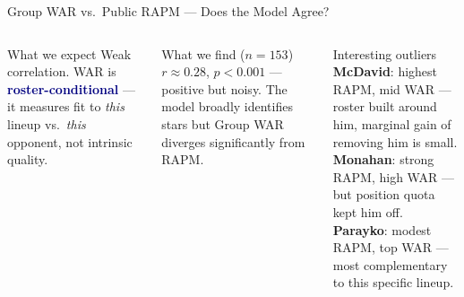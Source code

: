 \documentclass[aspectratio=169,11pt]{beamer}
\newcommand{\hl}[1]{\textcolor{navy}{\textbf{#1}}}
\begin{document}
\begin{frame}[shrink=10]{Group WAR vs.\ Public RAPM — Does the Model Agree?}
\begin{columns}[T]
\begin{block}{What we expect}
  \small Weak correlation. WAR is \hl{roster-conditional} — it measures fit to \textit{this} lineup vs.\ \textit{this} opponent, not intrinsic quality.
\end{block}
\vspace{0.3em}
\begin{exampleblock}{What we find ($n=153$)}
  \small $r \approx 0.28$, $p < 0.001$ — positive but noisy. The model broadly identifies stars but Group WAR diverges significantly from RAPM.
\end{exampleblock}
\vspace{0.3em}
\begin{alertblock}{Interesting outliers}
  \small \textbf{McDavid}: highest RAPM, mid WAR — roster built around him, marginal gain of removing him is small.\\[0.15em]
  \textbf{Monahan}: strong RAPM, high WAR — but position quota kept him off.\\[0.15em]
  \textbf{Parayko}: modest RAPM, top WAR — most complementary to this specific lineup.
\end{alertblock}


\end{columns}
\end{frame}
\end{document}
